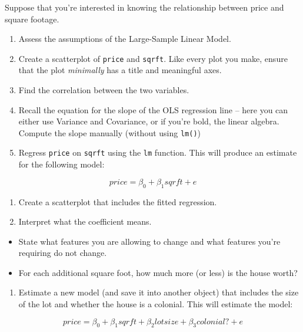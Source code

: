 \documentclass[
]{book}
\providecommand{\tightlist}{%
  \setlength{\itemsep}{0pt}\setlength{\parskip}{0pt}}
\theoremstyle{definition}
\theoremstyle{definition}
\theoremstyle{definition}
\theoremstyle{definition}
\theoremstyle{remark}
\begin{document}
Suppose that you're interested in knowing the relationship between price and square footage.

\begin{enumerate}
\def\labelenumi{\arabic{enumi}.}
\setcounter{enumi}{-1}
\item
  Assess the assumptions of the Large-Sample Linear Model.
\item
  Create a scatterplot of \texttt{price} and \texttt{sqrft}. Like every plot you make, ensure that the plot \emph{minimally} has a title and meaningful axes.
\item
  Find the correlation between the two variables.
\item
  Recall the equation for the slope of the OLS regression line -- here you can either use Variance and Covariance, or if you're bold, the linear algebra. Compute the slope manually (without using \texttt{lm()})
\item
  Regress \texttt{price} on \texttt{sqrft} using the \texttt{lm} function. This will produce an estimate for the following model:
\end{enumerate}

\[ 
price = \beta_{0} + \beta_{1} sqrft + e
\]

\begin{enumerate}
\def\labelenumi{\arabic{enumi}.}
\setcounter{enumi}{4}
\item
  Create a scatterplot that includes the fitted regression.
\item
  Interpret what the coefficient means.
\end{enumerate}

\begin{itemize}
\tightlist
\item
  State what features you are allowing to change and what features you're requiring do not change.
\item
  For each additional square foot, how much more (or less) is the house worth?
\end{itemize}

\begin{enumerate}
\def\labelenumi{\arabic{enumi}.}
\setcounter{enumi}{6}
\tightlist
\item
  Estimate a new model (and save it into another object) that includes the size of the lot and whether the house is a colonial. This will estimate the model:
\end{enumerate}

\[ 
price = \beta_{0} + \beta_{1} sqrft + \beta_{2} lotsize + \beta_{3} colonial? + e
\]
\end{document}
